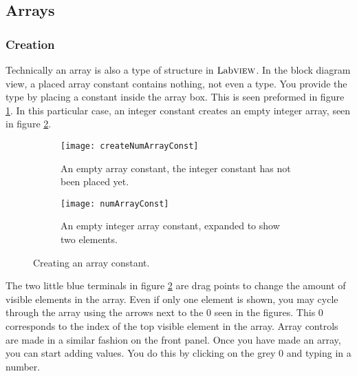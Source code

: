 \subsection{Arrays}
\subsubsection{Creation}
Technically an array is also a type of structure in $\text{Lab}\textsc{view}$. In the block diagram view, a placed array constant contains nothing, not even a type. You provide the type by placing a constant inside the array box. This is seen preformed in figure \ref{createNumArrayConst}. In this particular case, an integer constant creates an empty integer array, seen in figure \ref{numArrayConst}.\\
\begin{figure} %
	\centering
	\begin{subfigure}[b]{0.40\textwidth}
		\centering
		\texttt{[image: createNumArrayConst]}
		\caption{An empty array constant, the integer constant has not been placed yet.}
		\label{createNumArrayConst}
	\end{subfigure}
	\hfil
	\begin{subfigure}[b]{0.40\textwidth}
		\centering
		\texttt{[image: numArrayConst]}
		\caption{An empty integer array constant, expanded to show two elements.}
		\label{numArrayConst}
	\end{subfigure}
	\caption{Creating an array constant.}
	\label{arrayConsts}
\end{figure}

The two little blue terminals in figure \ref{numArrayConst} are drag points to change the amount of visible elements in the array. Even if only one element is shown, you may cycle through the array using the arrows next to the $0$ seen in the figures. This $0$ corresponds to the index of the top visible element in the array. Array controls are made in a similar fashion on the front panel. Once you have made an array, you can start adding values. You do this by clicking on the grey $0$ and typing in a number.  

